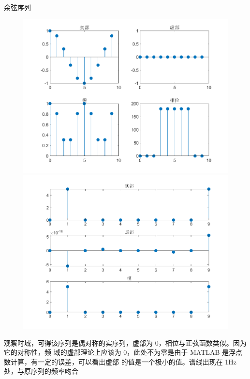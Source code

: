 \documentclass{beamer}
\begin{document}
\begin{frame}[t]{余弦序列}
    \begin{figure}[H]
        \centering
        \begin{minipage}[t]{0.48\textwidth}
        \centering
        \includegraphics[width=\textwidth]{figure/余弦序列.png}
        \end{minipage}
        \begin{minipage}[t]{0.48\textwidth}
        \centering
        \includegraphics[width=\textwidth]{figure/频谱_余弦序列.png}
        \end{minipage}
    \end{figure}

    \begin{block}{}
        观察时域，可得该序列是偶对称的实序列，虚部为 0，相位与正弦函数类似。因为它的对称性，频
域的虚部理论上应该为 0，此处不为零是由于 MATLAB 是浮点数计算，有一定的误差，可以看出虚部
的值是一个极小的值。谱线出现在 1Hz 处，与原序列的频率吻合
    \end{block}
\end{frame}
\end{document}
